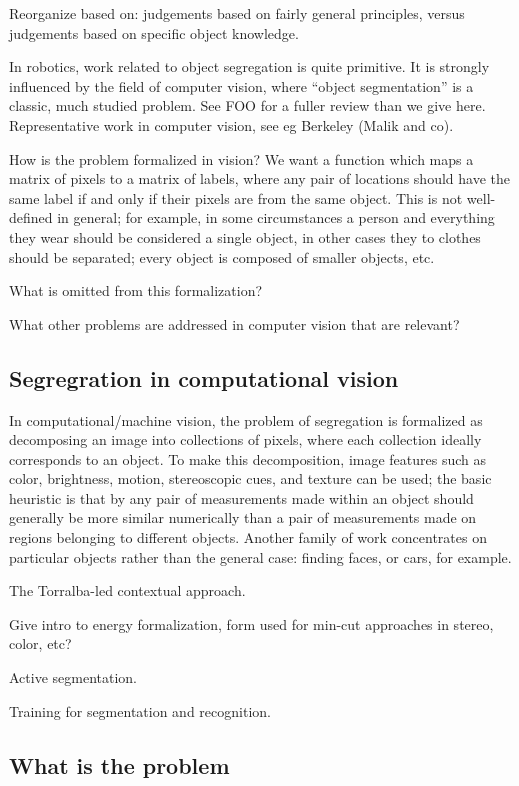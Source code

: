 Reorganize based on: judgements based on fairly general
principles, versus judgements based on specific object
knowledge.

In robotics, work related to object segregation is quite
primitive.  It is strongly influenced by the field
of computer vision, where ``object segmentation'' is a classic,
much studied problem.  See FOO for a fuller review than we give
here.  Representative work in computer vision,
see eg Berkeley (Malik and co).

How is the problem formalized in vision?  We want a function
which maps a matrix of pixels to a matrix of labels, where
any pair of locations should have the same label if and
only if their pixels are from the same object.
This is not well-defined in general; for example, in some
circumstances a person and everything they wear should be
considered a single object, in other cases they to clothes
should be separated; every object is composed of smaller
objects, etc.

What is omitted from this formalization?

What other problems are addressed in computer vision that
are relevant?


\subsection{Segregration in computational vision}

In computational/machine vision, the problem of segregation is
formalized as decomposing an image into collections of pixels, where
each collection ideally corresponds to an object.  To make this
decomposition, image features such as color, brightness, motion,
stereoscopic cues, and texture can be used; the basic heuristic
is that by any pair of measurements made within an object should
generally be more similar numerically than a pair of measurements
made on regions belonging to different objects.  Another family
of work concentrates on particular objects rather than the general
case: finding faces, or cars, for example.

The Torralba-led contextual approach.

Give intro to energy formalization, form used
for min-cut approaches in stereo, color, etc?

Active segmentation.

Training for segmentation and recognition.

\subsection{What is the problem}

